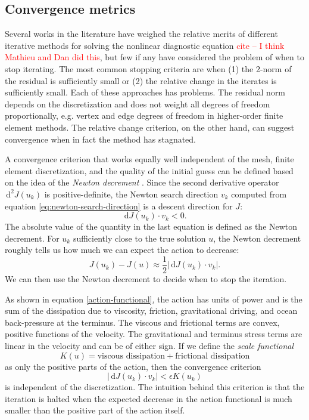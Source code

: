 \documentclass{article}
\theoremstyle{definition}
\theoremstyle{plain}
\newcommand{\ud}{\hspace{2pt}\mathrm{d}}
\begin{document}
\subsection{Convergence metrics} \label{sec:convergence-criteria}

Several works in the literature have weighed the relative merits of different iterative methods for solving the nonlinear diagnostic equation \textcolor{red}{cite -- I think Mathieu and Dan did this}, but few if any have considered the problem of when to stop iterating.
The most common stopping criteria are when (1) the 2-norm of the residual is sufficiently small or (2) the relative change in the iterates is sufficiently small.
Each of these approaches has problems.
The residual norm depends on the discretization and does not weight all degrees of freedom proportionally, e.g. vertex and edge degrees of freedom in higher-order finite element methods.
The relative change criterion, on the other hand, can suggest convergence when in fact the method has stagnated.

A convergence criterion that works equally well independent of the mesh, finite element discretization, and the quality of the initial guess can be defined based on the idea of the \emph{Newton decrement} \citep{nocedal2006numerical}.
Since the second derivative operator $\ud^2J(u_k)$ is positive-definite, the Newton search direction $v_k$ computed from equation \eqref{eq:newton-search-direction} is a descent direction for $J$:
\begin{equation}
    \ud J(u_k)\cdot v_k < 0.
\end{equation}
The absolute value of the quantity in the last equation is defined as the Newton decrement.
For $u_k$ sufficiently close to the true solution $u$, the Newton decrement roughly tells us how much we can expect the action to decrease:
\begin{equation}
    J(u_k) - J(u) \approx \frac{1}{2}|\ud J(u_k)\cdot v_k|.
\end{equation}
We can then use the Newton decrement to decide when to stop the iteration.

As shown in equation \eqref{action-functional}, the action has units of power and is the sum of the dissipation due to viscosity, friction, gravitational driving, and ocean back-pressure at the terminus.
The viscous and frictional terms are convex, positive functions of the velocity.
The gravitational and terminus stress terms are linear in the velocity and can be of either sign.
If we define the \emph{scale functional}
\begin{equation}
    K(u) = \text{viscous dissipation} + \text{frictional dissipation}
\end{equation}
as only the positive parts of the action, then the convergence criterion
\begin{equation}
    |\ud J(u_k)\cdot v_k| < \epsilon K(u_k)
\end{equation}
is independent of the discretization.
The intuition behind this criterion is that the iteration is halted when the expected decrease in the action functional is much smaller than the positive part of the action itself.
\end{document}
